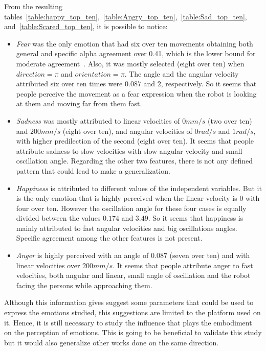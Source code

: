From the resulting tables~\ref{table:happy_top_ten},~\ref{table:Angry_top_ten},~\ref{table:Sad_top_ten}, and~\ref{table:Scared_top_ten}, it is possible to notice:

\begin{itemize}

	\item \textit{Fear} was the only emotion that had six over ten movements obtaining both general and specific alpha agreement over 0.41, which is the lower bound for moderate agreement~\cite{Viera2005}. Also, it was mostly selected (eight over ten) when $direction = \pi$ and $orientation = \pi$. The angle and the angular velocity attributed six over ten times were $0.087$ and $2$, respectively. So it seems that people perceive the movement as a fear expression when the robot is looking at them and moving far from them fast. 
	
	\item \textit{Sadness} was mostly attributed to linear velocities of $0 mm/s$ (two over ten) and $200 mm/s$ (eight over ten), and angular velocities of $0 rad/s$ and $1 rad/s$, with higher predilection of the second (eight over ten). It seems that people attribute sadness to slow velocities with slow angular velocity and small oscillation angle. Regarding the other two features, there is not any defined pattern that could lead to make a generalization. 

	\item \textit{Happiness} is attributed to different values of the independent variables. But it is the only emotion that is highly perceived when the linear velocity is $0$ with four over ten. However the oscillation angle for these four cases is equally divided between the values $0.174$ and $3.49$. %
So it seems that happiness is mainly attributed to fast angular velocities and big oscillations angles. Specific agreement among the other features is not present.

	\item \textit{Anger} is highly perceived with an angle of $0.087$ (seven over ten) and with linear velocities over $200 mm/s$. It seems that people attribute anger to fast velocities, both angular and linear, small angle of oscillation and the robot facing the persons while approaching them. 
\end{itemize} 
Although this information gives suggest some parameters that could be used to express the emotions studied, this suggestions are limited to the platform used on it. Hence, it is still necessary to study the influence that plays the embodiment on the perception of emotions. This is going to be beneficial to validate this study but it would also generalize other works done on the same direction.
